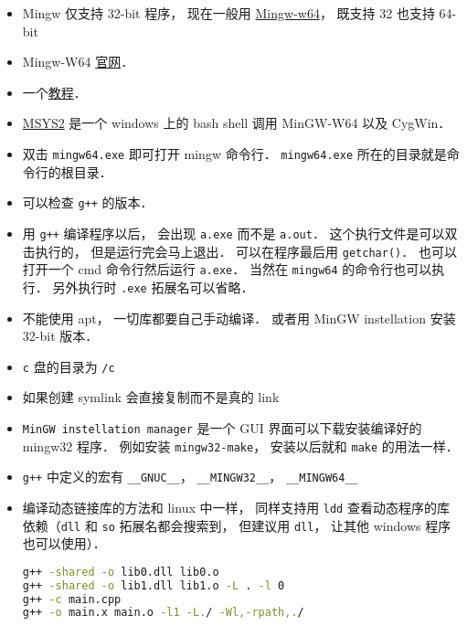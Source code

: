 
\begin{itemize}
\item Mingw 仅支持 32-bit 程序， 现在一般用 \href{https://en.wikipedia.org/wiki/Mingw-w64}{Mingw-w64}， 既支持 32 也支持 64-bit
\item Mingw-W64 \href{https://www.mingw-w64.org/}{官网}．
\item 一个\href{https://www3.ntu.edu.sg/home/ehchua/programming/howto/Cygwin_HowTo.html}{教程}．
\item \href{https://www.msys2.org/}{MSYS2} 是一个 windows 上的 bash shell 调用 MinGW-W64 以及 CygWin．
\item 双击 \verb|mingw64.exe| 即可打开 mingw 命令行． \verb|mingw64.exe| 所在的目录就是命令行的根目录．
\item 可以检查 \verb|g++| 的版本．
\item 用 \verb|g++| 编译程序以后， 会出现 \verb|a.exe| 而不是 \verb|a.out|． 这个执行文件是可以双击执行的， 但是运行完会马上退出． 可以在程序最后用 \verb|getchar()|． 也可以打开一个 cmd 命令行然后运行 \verb|a.exe|． 当然在 \verb|mingw64| 的命令行也可以执行． 另外执行时 \verb|.exe| 拓展名可以省略．
\item 不能使用 apt， 一切库都要自己手动编译． 或者用 MinGW instellation 安装 32-bit 版本．
\item \verb|c| 盘的目录为 \verb|/c|
\item 如果创建 symlink 会直接复制而不是真的 link
\item \verb|MinGW instellation manager| 是一个 GUI 界面可以下载安装编译好的 mingw32 程序． 例如安装 \verb|mingw32-make|， 安装以后就和 \verb|make| 的用法一样．
\item \verb|g++| 中定义的宏有 \verb|__GNUC__|， \verb|__MINGW32__|， \verb|__MINGW64__|
\item 编译动态链接库的方法和 linux 中一样， 同样支持用 \verb|ldd| 查看动态程序的库依赖（\verb|dll| 和 \verb|so| 拓展名都会搜索到， 但建议用 \verb|dll|， 让其他 windows 程序也可以使用）．
\begin{lstlisting}[language=bash]
g++ -shared -o lib0.dll lib0.o
g++ -shared -o lib1.dll lib1.o -L . -l 0
g++ -c main.cpp
g++ -o main.x main.o -l1 -L./ -Wl,-rpath,./
\end{lstlisting}
\end{itemize}

